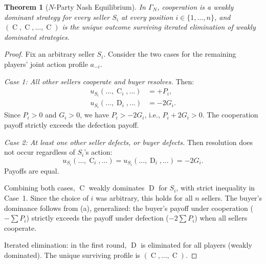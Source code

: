 \documentclass[11pt,a4paper]{article}
\newtheorem{theorem}{Theorem}[section]
\theoremstyle{definition}
\theoremstyle{remark}
\newcommand{\pay}{P}           %
\newcommand{\cumval}{G}        %
\DeclareMathOperator{\Coop}{C}
\DeclareMathOperator{\Def}{D}
\begin{document}
\begin{theorem}[$N$-Party Nash Equilibrium]
\label{thm:n-party-nash}
In $\Gamma_N$, cooperation is a weakly dominant strategy for every
seller $S_i$ at every position $i \in \{1, \ldots, n\}$, and
$(\Coop, \Coop, \ldots, \Coop)$ is the unique outcome surviving
iterated elimination of weakly dominated strategies.
\end{theorem}

\begin{proof}
Fix an arbitrary seller $S_i$. Consider the two cases for the remaining
players' joint action profile $a_{-i}$.

\emph{Case 1: All other sellers cooperate and buyer resolves.} Then:
\begin{align}
  u_{S_i}(\ldots, \Coop_i, \ldots) &= +\pay_i, \\
  u_{S_i}(\ldots, \Def_i, \ldots) &= -2\cumval_i.
\end{align}
Since $\pay_i > 0$ and $\cumval_i > 0$, we have
$\pay_i > -2\cumval_i$, i.e., $\pay_i + 2\cumval_i > 0$. The
cooperation payoff strictly exceeds the defection payoff.

\emph{Case 2: At least one other seller defects, or buyer defects.}
Then resolution does not occur regardless of $S_i$'s action:
\begin{equation}
  u_{S_i}(\ldots, \Coop_i, \ldots) = u_{S_i}(\ldots, \Def_i, \ldots)
    = -2\cumval_i.
\end{equation}
Payoffs are equal.

Combining both cases, $\Coop$ weakly dominates $\Def$ for $S_i$, with
strict inequality in Case~1. Since the choice of $i$ was arbitrary,
this holds for all $n$ sellers. The buyer's dominance follows from
(a), generalized: the buyer's payoff under
cooperation ($-\sum \pay_i$) strictly exceeds the payoff under defection
($-2\sum \pay_i$) when all sellers cooperate.

Iterated elimination: in the first round, $\Def$ is eliminated for all
players (weakly dominated). The unique surviving profile is
$(\Coop, \ldots, \Coop)$.
\end{proof}
\end{document}
